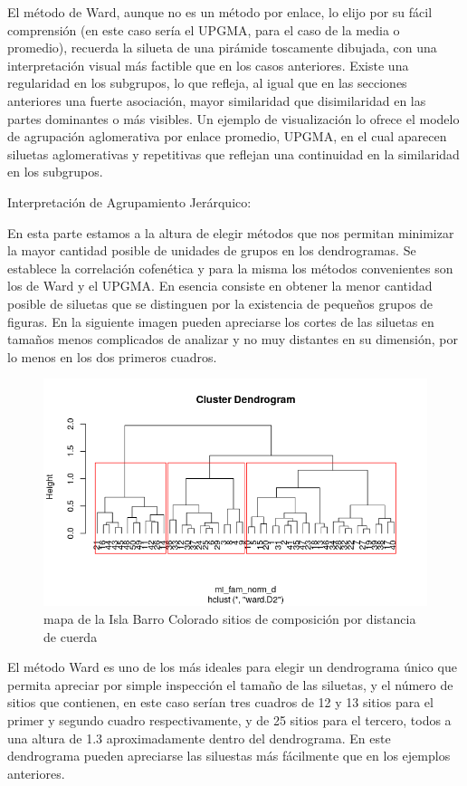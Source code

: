 \documentclass[11pt,]{article}
\begin{document}
El método de Ward, aunque no es un método por enlace, lo elijo por su
fácil comprensión (en este caso sería el UPGMA, para el caso de la media
o promedio), recuerda la silueta de una pirámide toscamente dibujada,
con una interpretación visual más factible que en los casos anteriores.
Existe una regularidad en los subgrupos, lo que refleja, al igual que en
las secciones anteriores una fuerte asociación, mayor similaridad que
disimilaridad en las partes dominantes o más visibles. Un ejemplo de
visualización lo ofrece el modelo de agrupación aglomerativa por enlace
promedio, UPGMA, en el cual aparecen siluetas aglomerativas y
repetitivas que reflejan una continuidad en la similaridad en los
subgrupos.

Interpretación de Agrupamiento Jerárquico:

En esta parte estamos a la altura de elegir métodos que nos permitan
minimizar la mayor cantidad posible de unidades de grupos en los
dendrogramas. Se establece la correlación cofenética y para la misma los
métodos convenientes son los de Ward y el UPGMA. En esencia consiste en
obtener la menor cantidad posible de siluetas que se distinguen por la
existencia de pequeños grupos de figuras. En la siguiente imagen pueden
apreciarse los cortes de las siluetas en tamaños menos complicados de
analizar y no muy distantes en su dimensión, por lo menos en los dos
primeros cuadros.

\begin{figure}
\centering
\includegraphics[width=1.00000\textwidth]{agrupamiento_dendrograma.png}
\caption{mapa de la Isla Barro Colorado sitios de composición por
distancia de cuerda \label{fig:bci_map}}
\end{figure}

El método Ward es uno de los más ideales para elegir un dendrograma
único que permita apreciar por simple inspección el tamaño de las
siluetas, y el número de sitios que contienen, en este caso serían tres
cuadros de 12 y 13 sitios para el primer y segundo cuadro
respectivamente, y de 25 sitios para el tercero, todos a una altura de
1.3 aproximadamente dentro del dendrograma. En este dendrograma pueden
apreciarse las siluestas más fácilmente que en los ejemplos anteriores.
\end{document}
